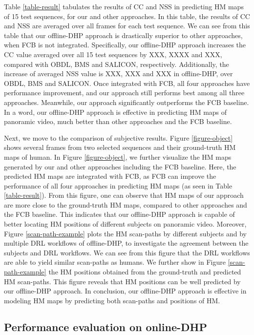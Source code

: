 \documentclass[10pt,journal,compsoc]{IEEEtran}
\begin{document}
Table \ref{table-result} tabulates the results of CC and NSS in predicting HM maps of 15 test sequences, for our and other approaches.
In this table, the results of CC and NSS are averaged over all frames for each test sequence.
We can see from this table that our offline-DHP approach is drastically superior to other approaches, when FCB is not integrated.
Specifically, our  offline-DHP approach increases the CC value averaged over all 15 test sequences by XXX, XXXX and XXX, compared with OBDL, BMS and SALICON, respectively.
Additionally, the increase of averaged NSS value is XXX, XXX and XXX in offline-DHP, over OBDL, BMS and SALICON.
Once integrated with FCB, all four approaches have performance improvement, and our approach still performs best among all three approaches. Meanwhile, our approach significantly outperforms the FCB baseline.
In a word, our offline-DHP approach is effective in predicting HM maps of panoramic video, much better than other approaches and the FCB baseline.


Next, we move to the comparison of subjective results. Figure \ref{figure-object} shows several frames from two selected sequences and their ground-truth HM maps of human.
In Figure \ref{figure-object}, we further visualize the HM maps generated by our and other approaches including the FCB baseline. Here, the predicted HM maps are integrated with FCB, as FCB can improve the performance of all four approaches in predicting HM maps (as seen in Table \ref{table-result}).
From this figure, one can observe that HM maps of our approach are more close to the ground-truth HM maps, compared to other approaches and the FCB baseline.
This indicates that our offline-DHP approach is capable of better locating HM positions of different subjects on panoramic video.
Moreover, Figure \ref{scan-path-example} plots the HM scan-paths by different subjects and by multiple DRL workflows of offline-DHP, to investigate the agreement between the subjects and DRL workflows.
We can see from this figure that the DRL workflows are able to yield similar scan-paths as humans.  We further show in Figure \ref{scan-path-example} the HM positions obtained from the ground-truth and predicted HM scan-paths. This figure reveals that HM positions can be well predicted by our offline-DHP approach. In conclusion, our offline-DHP approach is effective in modeling HM maps by predicting both scan-paths and positions of HM.



\subsection{Performance evaluation on online-DHP}\label{sec:evaluation_online}
\label{online-compare}
\end{document}
